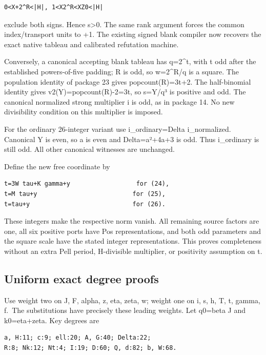 \documentclass[
  10pt,
]{article}
\begin{document}
\begin{verbatim}
0<X+2^R<|H|, 1<X2^R<XZ0<|H|
\end{verbatim}

exclude both signs. Hence s\textgreater0. The same rank argument forces
the common index/transport units to +1. The existing signed blank
compiler now recovers the exact native tableau and calibrated refutation
machine.

Conversely, a canonical accepting blank tableau has q=2\^{}t, with t odd
after the established powers-of-five padding; R is odd, so w=2\^{}R/q is
a square. The population identity of package 23 gives popcount(R)=3t+2.
The half-binomial identity gives v2(Y)=popcount(R)-2=3t, so s=Y/q³ is
positive and odd. The canonical normalized strong multiplier i is odd,
as in package 14. No new divisibility condition on this multiplier is
imposed.

For the ordinary 26-integer variant use i\_ordinary=Delta i\_normalized.
Canonical Y is even, so a is even and Delta=a²+4a+3 is odd. Thus
i\_ordinary is still odd. All other canonical witnesses are unchanged.

Define the new free coordinate by

\begin{verbatim}
t=3W tau+K gamma+y                  for (24),
t=M tau+y                          for (25),
t=tau+y                            for (26).
\end{verbatim}

These integers make the respective norm vanish. All remaining source
factors are one, all six positive ports have Pos representations, and
both odd parameters and the square scale have the stated integer
representations. This proves completeness without an extra Pell period,
H-divisible multiplier, or positivity assumption on t.

\subsection{Uniform exact degree
proofs}\label{uniform-exact-degree-proofs}

Use weight two on J, F, alpha, z, eta, zeta, w; weight one on
i, s, h, T, t, gamma, f.~The substitutions have precisely these leading
weights. Let q0=beta J and k0=eta+zeta. Key degrees are

\begin{verbatim}
a, H:11; c:9; ell:20; A, G:40; Delta:22;
R:8; Nk:12; Nt:4; I:19; D:60; Q, d:82; b, W:68.
\end{verbatim}
\end{document}
